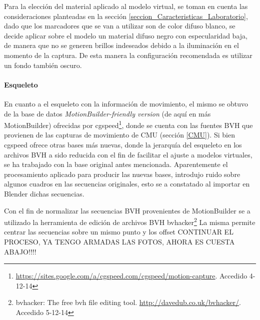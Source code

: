 Para la elección del material aplicado al modelo virtual, se toman en cuenta las consideraciones planteadas en la sección \ref{seccion_Caracteristicas_Laboratorio}, dado que los marcadores que se van a utilizar son de color difuso blanco, se decide aplicar sobre el modelo un material difuso negro con especularidad baja, de manera que no se generen brillos indeseados debido a la iluminación en el momento de la captura. De esta manera la configuración recomendada es utilizar un fondo también oscuro.

\paragraph{Esqueleto}
En cuanto a el esqueleto con la información de movimiento, el mismo se obtuvo de la base de datos \textit{MotionBuilder-friendly version} (de aquí en más MotionBuilder) ofrecidas por cgspeed\footnote{\textcolor{blue}{\underline{\url{https://sites.google.com/a/cgspeed.com/cgspeed/motion-capture}}}. Accedido 4-12-14},
 donde se cuenta con las fuentes BVH que provienen de las capturas de movimiento de CMU (sección \ref{CMU}). Si bien cgspeed ofrece otras bases más nuevas, donde la jerarquía del esqueleto en los archivos BVH a sido reducida con el fin de facilitar el ajuste a modelos virtuales, se ha trabajado con la base original antes mencionada. Aparentemente el procesamiento aplicado para producir las nuevas bases, introdujo ruido sobre algunos cuadros en las secuencias originales, esto se a constatado al importar en Blender dichas secuencias.
      
 Con el fin de normalizar las secuencias BVH provenientes de MotionBuilder se a utilizado la herramienta de edición de archivos BVH bvhacker\footnote{bvhacker: The free bvh file editing tool. \textcolor{blue}{\underline{\url{ http://davedub.co.uk/bvhacker/}}}. Accedido 5-12-14} La misma permite centrar las secuencias sobre un mismo punto y los offset
 CONTINUAR EL PROCESO, YA TENGO ARMADAS LAS FOTOS, 
 AHORA ES CUESTA ABAJO!!!! 

 
    


